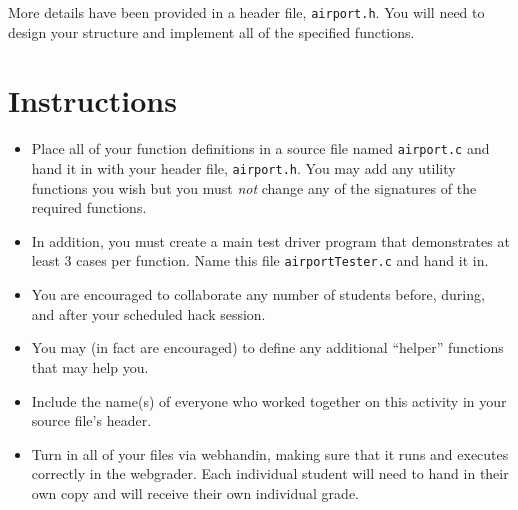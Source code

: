 \documentclass[12pt]{scrartcl}
\begin{document}
More details have been provided in a header file, \texttt{airport.h}.
You will need to design your structure and implement all of the specified 
functions.


\section*{Instructions}

\begin{itemize}

  \item Place all of your function definitions in a source file named 
  \texttt{airport.c} and hand it in with your header file, 
  \texttt{airport.h}.  You may add any utility functions you
  wish but you must \emph{not} change any of the signatures of the required
  functions.
  
  \item In addition, you must create a main test driver program that 
  demonstrates at least 3 cases per function.  Name this file 
  \texttt{airportTester.c} and hand it in.

  \item You are encouraged to collaborate any number of students 
  before, during, and after your scheduled hack session.  

  \item You may (in fact are encouraged) to define any additional
  ``helper'' functions that may help you.

  \item Include the name(s) of everyone who worked together on
  this activity in your source file's header.

  \item Turn in all of your files via webhandin, making sure that 
  it runs and executes correctly in the webgrader.  Each individual 
  student will need to hand in their own copy and will receive 
  their own individual grade.
\end{itemize}  
\end{document}
